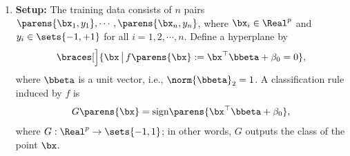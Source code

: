 \documentclass[12pt]{article}
\begin{document}
\begin{enumerate}[label=\textbf{\arabic*.}]

	\item \textbf{Setup:} The training data consists of $n$ pairs $\parens{\bx_1, y_1}, \cdots, \parens{\bx_n, y_n}$, where $\bx_i \in \Real^p$ and $y_i \in \sets{-1, +1}$ for all $i = 1, 2, \cdots, n$. Define a hyperplane by 
	\begin{align*}
		\braces[\Big]{\bx \,\big\vert\, f \parens{\bx} := \bx^\top \bbeta + \beta_0 = 0}, 
	\end{align*}
	where $\bbeta$ is a unit vector, i.e., $\norm{\bbeta}_2 = 1$. A classification rule induced by $f$ is 
	\begin{align*}
		G \parens{\bx} = \mathrm{sign} \parens{\bx^\top \bbeta + \beta_0}, 
	\end{align*}
	where $G: \Real^p \to \sets{-1, 1}$; in other words, $G$ outputs the class of the point $\bx$. 
	

\end{enumerate}
\end{document}
